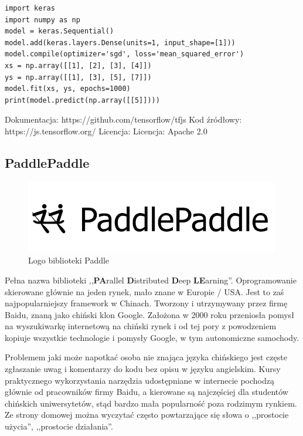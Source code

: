 \documentclass[12pt,a4paper,twoside,titlepage,openright]{book}
\begin{document}
\noindent
\begin{minipage}{\linewidth}
\begin{lstlisting}[caption=Prosty model w języku Python używając Keras, label=lst:test]
import keras
import numpy as np
model = keras.Sequential()
model.add(keras.layers.Dense(units=1, input_shape=[1]))
model.compile(optimizer='sgd', loss='mean_squared_error')
xs = np.array([[1], [2], [3], [4]])
ys = np.array([[1], [3], [5], [7]])
model.fit(xs, ys, epochs=1000)
print(model.predict(np.array([[5]])))
\end{lstlisting}
\end{minipage}

\noindent
\newline
Dokumentacja: https://github.com/tensorflow/tfjs
\newline
Kod źródłowy: https://js.tensorflow.org/
\newline
Licencja: Licencja: Apache 2.0

\subsection{PaddlePaddle}
\begin{figure}[ht]
	\centering
			\includegraphics[resolution=100, scale=1.2]{PaddlePaddle.png}
		\caption{Logo biblioteki Paddle}
\end{figure}
Pełna nazwa biblioteki ,,\textbf{PA}rallel \textbf{D}istributed \textbf{D}eep \textbf{LE}arning''. Oprogramowanie skierowane głównie na jeden rynek, mało znane w Europie / USA. Jest to zaś najpopularniejszy framework w Chinach. Tworzony i utrzymywany przez firmę Baidu, znaną jako chiński klon Google. Założona w 2000 roku przeniosła pomysł na wyszukiwarkę internetową na chiński rynek i od tej pory z powodzeniem kopiuje wszystkie technologie i pomysły Google, w tym autonomiczne samochody. 

Problemem jaki może napotkać osoba nie znająca języka chińskiego jest częste zgłaszanie uwag i komentarzy do kodu bez opisu w języku angielskim. Kursy praktycznego wykorzystania narzędzia udostępniane w internecie pochodzą głównie od pracowników firmy Baidu, a kierowane są najczęściej dla studentów chińskich uniwersytetów, stąd bardzo mała popularność poza rodzimym rynkiem. Ze strony domowej można wyczytać często powtarzające się słowa o ,,prostocie użycia'', ,,prostocie działania''. 
\end{document}
